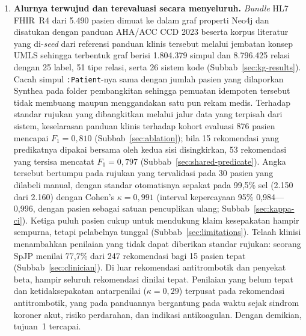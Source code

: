 \begin{enumerate}
    \item \textbf{Alurnya terwujud dan terevaluasi secara menyeluruh.} \emph{Bundle} HL7
    FHIR~R4 dari 5.490 pasien dimuat ke dalam graf properti Neo4j dan disatukan dengan
    panduan AHA/ACC CCD 2023 beserta korpus literatur yang di-\emph{seed} dari referensi
    panduan klinis tersebut melalui jembatan konsep UMLS sehingga terbentuk graf berisi 1.804.379
    simpul dan 8.796.425 relasi dengan 25 label, 51 tipe relasi, serta 26 sistem kode
    (Subbab~\ref{sec:kg-results}). Cacah simpul \texttt{:Patient}-nya sama dengan jumlah
    pasien yang dilaporkan Synthea pada folder pembangkitan sehingga pemuatan idempoten tersebut tidak membuang
    maupun menggandakan satu pun rekam medis. Terhadap standar rujukan yang dibangkitkan
    melalui jalur data yang terpisah dari sistem, keselarasan panduan klinis terhadap kohort
    evaluasi 876
    pasien mencapai $F_1 = 0{,}810$ (Subbab~\ref{sec:ablation}); bila 15 rekomendasi yang
    predikatnya dipakai bersama oleh kedua sisi disingkirkan, 53 rekomendasi yang tersisa
    mencatat $F_1 = 0{,}797$ (Subbab~\ref{sec:shared-predicate}). Angka
    tersebut bertumpu pada rujukan yang tervalidasi pada 30
    pasien yang dilabeli manual, dengan standar otomatisnya sepakat pada 99,5\%
    sel (2.150 dari 2.160) dengan Cohen's
    $\kappa = 0{,}991$ (interval kepercayaan 95\% 0,984---0,996, dengan pasien sebagai satuan
    pencuplikan ulang; Subbab~\ref{sec:kappa-ci}). Ketiga puluh pasien cukup untuk mendukung
    klaim kesepakatan hampir sempurna, tetapi pelabelnya tunggal
    (Subbab~\ref{sec:limitations}). Telaah klinisi menambahkan penilaian yang tidak dapat
    diberikan standar rujukan: seorang SpJP menilai 77,7\% dari 247 rekomendasi bagi 15 pasien
    tepat (Subbab~\ref{sec:clinician}). Di luar rekomendasi antitrombotik dan penyekat beta,
    hampir seluruh rekomendasi dinilai tepat. Penilaian yang belum tepat dan ketidaksepakatan
    antarpenilai ($\kappa = 0{,}29$) terpusat pada rekomendasi antitrombotik, yang pada
    panduannya bergantung pada waktu sejak sindrom koroner akut, risiko perdarahan, dan
    indikasi antikoagulan. Dengan demikian, tujuan~1 tercapai.


\end{enumerate}
